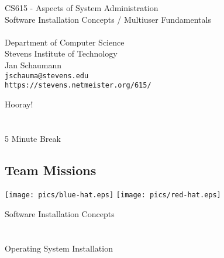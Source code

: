 \documentclass[xga]{xdvislides}
\begin{document}
\setfontphv

\lhead{\slidetitle}                               %
\cfoot{\relax}                               %
\rfoot{\Gray{\today}}

\vspace*{\fill}
\begin{center}
	\Hugesize
		CS615 - Aspects of System Administration\\ [1em]
		Software Installation Concepts / Multiuser Fundamentals\\ [1em]
	\hspace*{5mm}\blueline\\ [1em]
	\Normalsize
		Department of Computer Science\\
		Stevens Institute of Technology\\
		Jan Schaumann\\
		\verb+jschauma@stevens.edu+\\
		\verb+https://stevens.netmeister.org/615/+
\end{center}
\vspace*{\fill}

\newpage
\vspace*{\fill}
\begin{center}
    \Hugesize
        Hooray! \\ [1em]
    \hspace*{5mm}
    \blueline\\
    \hspace*{5mm}\\
        5 Minute Break
\end{center}
\vspace*{\fill}

\subsection{Team Missions}
\vfill
\begin{center}
\texttt{[image: pics/blue-hat.eps]}
\hspace{.5in}
\texttt{[image: pics/red-hat.eps]}
\end{center}
\vfill

\newpage
\vspace*{\fill}
\begin{center}
	\Hugesize
		Software Installation Concepts \\ [1em]
	\hspace*{5mm}
	\blueline\\
	\hspace*{5mm}\\
		Operating System Installation
\end{center}
\vspace*{\fill}
\end{document}
